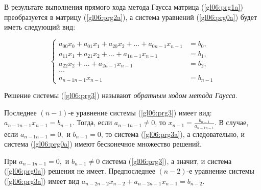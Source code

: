 В результате выполнения прямого хода метода Гаусса матрица (\ref{gl06:prg1a}) преобразуется в матрицу (\ref{gl06:prg2a}), а
система уравнений (\ref{gl06:prg0a}) будет иметь следующий вид:

\begin{equation}\label{gl06:prg3a}
\left\{\begin{matrix}
a_{00}x_0+a_{01}x_1+a_{20}x_2+...+a_{0n-1}x_{n-1}&=b_0,\\
a_{11}x_1+a_{21}x_2+...+a_{1n-1}x_{n-1}&=b_1,\\
a_{22}x_2+...+a_{2n-1}x_{n-1}&=b_2,\\
...\\
a_{n-1n-1}x_{n-1}&=b_{n-1}
\end{matrix}\right.
\end{equation}




Решение системы (\ref{gl06:prg3}) называют \emph{обратным ходом метода Гаусса}.

Последнее $(n-1)$-е уравнение системы (\ref{gl06:prg3}) имеет вид:
 $a_{n-1n-1}x_{n-1}=b_{n-1}$.
Тогда, если  $a_{n-1n-1}\neq 0$, то  $x_{n-1}=\frac{b_{n-1}}{a_{n-1n-1}}$. 
В случае, если  $a_{n-1n-1}=0,$ и $b_{n-1}=0$, то система (\ref{gl06:prg3a}), 
а следовательно, и система (\ref{gl06:prg0a}) имеют бесконечное множество
решений. 

При  $a_{n-1n-1}=0,$ и  $b_{n-1}\neq 0$  система (\ref{gl06:prg3}), а значит, и система (\ref{gl06:prg0a}) решения не
имеет.
Предпоследнее $(n-2)$-е уравнение системы (\ref{gl06:prg3a}) имеет вид
$a_{n-2n-2}x_{n-2}+a_{n-2n-1}x_{n-1}=b_{n-2}$.



